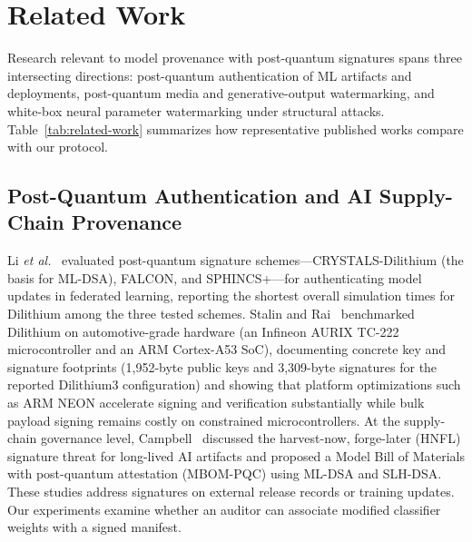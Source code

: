 \section{Related Work}
\label{sec:related-work}

Research relevant to model provenance with post-quantum signatures spans three intersecting directions: post-quantum authentication of ML artifacts and deployments, post-quantum media and generative-output watermarking, and white-box neural parameter watermarking under structural attacks. Table~\ref{tab:related-work} summarizes how representative published works compare with our protocol.

\subsection{Post-Quantum Authentication and AI Supply-Chain Provenance}
Li \emph{et al.}~\cite{li2024federated} evaluated post-quantum signature schemes---CRYSTALS-Dilithium (the basis for ML-DSA), FALCON, and SPHINCS+---for authenticating model updates in federated learning, reporting the shortest overall simulation times for Dilithium among the three tested schemes. Stalin and Rai~\cite{stalin2025automotive} benchmarked Dilithium on automotive-grade hardware (an Infineon AURIX TC-222 microcontroller and an ARM Cortex-A53 SoC), documenting concrete key and signature footprints (1,952-byte public keys and 3,309-byte signatures for the reported Dilithium3 configuration) and showing that platform optimizations such as ARM NEON accelerate signing and verification substantially while bulk payload signing remains costly on constrained microcontrollers. At the supply-chain governance level, Campbell~\cite{campbell2026mbom} discussed the harvest-now, forge-later (HNFL) signature threat for long-lived AI artifacts and proposed a Model Bill of Materials with post-quantum attestation (MBOM-PQC) using ML-DSA and SLH-DSA. These studies address signatures on external release records or training updates. Our experiments examine whether an auditor can associate modified classifier weights with a signed manifest.

